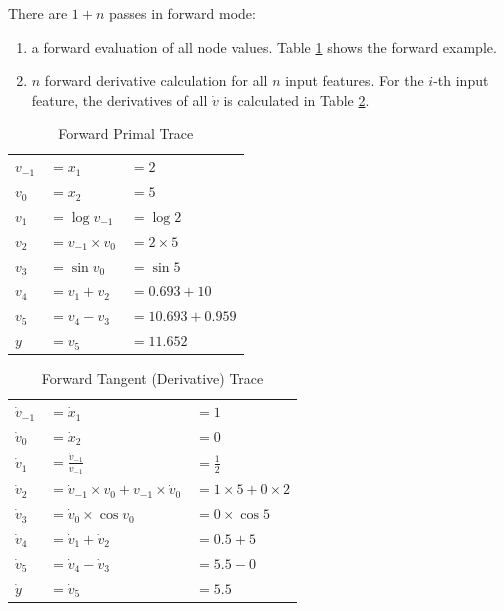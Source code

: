 There are $1+n$ passes in forward mode:
\begin{enumerate}
    \item a forward evaluation of all node values. Table \ref{forwardprimaltracetable} shows the forward example.
    \item $n$ forward derivative calculation for all $n$ input features. For the $i$-th input feature, the derivatives of all $\dot{v}$ is calculated in Table \ref{forwardtangenttrace}.
\end{enumerate}

\begin{table}[H]
\centering
    \begin{tabular}{lll}
        $v_{-1}$ & $= x_1$ & $ = 2$ \\
        $v_0$ & $= x_2$ & $=5$ \\
        $v_1$ & $=\log{v_{-1}}$ & $= \log{2}$ \\
        $v_2$ & $=v_{-1} \times v_0$ & $= 2 \times 5 $\\
        $v_3$ & $=\sin{v_0}$ & $=\sin{5}$\\
        $v_4$ & $=v_1 + v_2$ & $=0.693+10$ \\
        $v_5$ & $=v_4 - v_3$ & $=10.693 + 0.959$ \\
        $y$ & $=v_5$ & $=11.652$ \\
    \end{tabular}
\caption{Forward Primal Trace}
\label{forwardprimaltracetable}
\end{table}


\begin{table}[H]
\centering
    \begin{tabular}{lll}
        $\dot{v}_{-1}$ & $= \dot{x}_1$ & $ = 1$ \\
        $\dot{v}_0$ & $= \dot{x}_2$ & $=0$ \\
        $\dot{v}_1$ & $= \displaystyle \frac{\dot{v}_{-1}}{v_{-1}}$ & $=\displaystyle \frac{1}{2}$ \\
        $\dot{v}_2$ & $=\dot{v}_{-1} \times v_0 + v_{-1} \times \dot{v}_0$ & $= 1 \times 5 + 0 \times 2$\\
        $\dot{v}_3$ & $=\dot{v}_0 \times \cos{v_0}$ & $=0 \times \cos{5}$ \\
        $\dot{v}_4$ & $=\dot{v}_1 + \dot{v}_2$ & $= 0.5 + 5$ \\
        $\dot{v}_5$ & $=\dot{v}_4 - \dot{v}_3$ & $= 5.5 - 0$ \\
        $\dot{y}$ & $=\dot{v}_5$ & $= 5.5$ \\
    \end{tabular}
\caption{Forward Tangent (Derivative) Trace}
\label{forwardtangenttrace}
\end{table}

